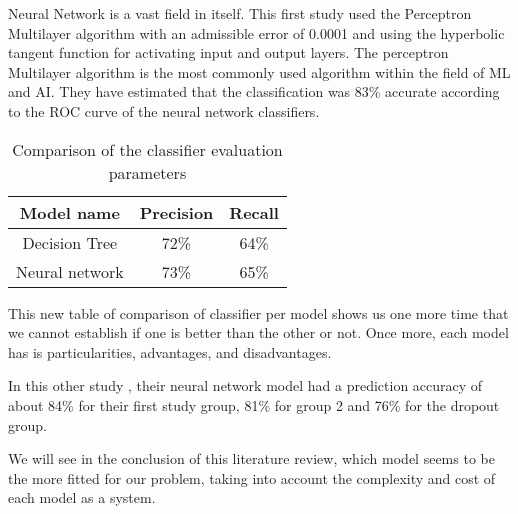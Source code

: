 \documentclass[conference]{IEEEtran}
\begin{document}
Neural Network is a vast field in itself. This first study used the Perceptron Multilayer algorithm with an admissible error of 0.0001 and using the hyperbolic tangent function for activating input and output layers\cite{viloria_integration_2019}. The perceptron Multilayer algorithm is the most commonly used algorithm within the field of ML and AI.\cite{siri_predicting_2015} They have estimated that the classification was 83\% accurate according to the ROC curve of the neural network classifiers.
\begin{table}[H]
    \centering
    \caption{Comparison of the classifier evaluation parameters\cite{viloria_integration_2019}}
    \begin{tabular}{|c|c|c|}
        \hline
        \textbf{Model name} & \textbf{Precision}  & \textbf{Recall}\\
        \hline
        Decision Tree & 72\% & 64\% \\
        \hline
        Neural network & 73\% & 65\% \\
        \hline
    \end{tabular}
    \label{tab:comparaison_classifier_eval_param_viloria}
\end{table}

This new table of comparison of classifier per model shows us one more time that we cannot establish if one is better than the other or not. Once more, each model has is particularities, advantages, and disadvantages. 

In this other study \cite{siri_predicting_2015}, their neural network model had a prediction accuracy of about 84\% for their first study group, 81\% for group 2 and 76\% for the dropout group. 

We will see in the conclusion of this literature review, which model seems to be the more fitted for our problem, taking into account the complexity and cost of each model as a system.
\vspace{8pt}
\end{document}
